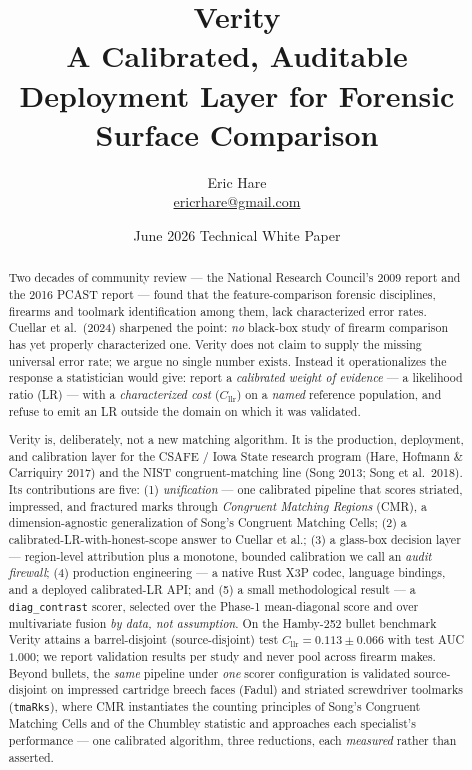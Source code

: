 \documentclass[11pt]{article}
\title{\vspace{-1.2cm}\textbf{Verity}\\[2pt]
\large A Calibrated, Auditable Deployment Layer for Forensic Surface Comparison}
\author{Eric Hare\\[-2pt]\small \href{mailto:ericrhare@gmail.com}{ericrhare@gmail.com}}
\date{\small June 2026 \;\textbar\; Technical White Paper}
\newcommand{\Cllr}{C_{\mathrm{llr}}}
\newcommand{\diagcontrast}{\texttt{diag\_contrast}}
\newcommand{\code}[1]{\texttt{#1}}
\begin{document}
\maketitle
\vspace{-0.6cm}

\begin{abstract}
\noindent
Two decades of community review --- the National Research Council's 2009 report
and the 2016 PCAST report --- found that the feature-comparison forensic
disciplines, firearms and toolmark identification among them, lack characterized
error rates. Cuellar et al.\ (2024) sharpened the point: \emph{no} black-box study
of firearm comparison has yet properly characterized one. Verity does not claim to
supply the missing universal error rate; we argue no single number exists. Instead
it operationalizes the response a statistician would give: report a \emph{calibrated
weight of evidence} --- a likelihood ratio (LR) --- with a \emph{characterized
cost} ($\Cllr$) on a \emph{named} reference population, and refuse to emit an LR
outside the domain on which it was validated.

Verity is, deliberately, not a new matching algorithm. It is the production,
deployment, and calibration layer for the CSAFE / Iowa State research program
(Hare, Hofmann \& Carriquiry 2017) and the NIST congruent-matching line
(Song 2013; Song et al.\ 2018). Its contributions are five: (1) \emph{unification}
--- one calibrated pipeline that scores striated, impressed, and fractured marks
through \emph{Congruent Matching Regions} (CMR), a dimension-agnostic
generalization of Song's Congruent Matching Cells; (2) a calibrated-LR-with-honest-scope
answer to Cuellar et al.; (3) a glass-box decision layer --- region-level
attribution plus a monotone, bounded calibration we call an \emph{audit firewall};
(4) production engineering --- a native Rust X3P codec, language bindings, and a
deployed calibrated-LR API; and (5) a small methodological result --- a
\diagcontrast{} scorer, selected over the Phase-1 mean-diagonal score and over
multivariate fusion \emph{by data, not assumption}. On the Hamby-252 bullet
benchmark Verity attains a barrel-disjoint (source-disjoint) test
$\Cllr = \num{0.113} \pm \num{0.066}$ with test AUC $\num{1.000}$; we report
validation results per study and never pool across firearm makes. Beyond bullets,
the \emph{same} pipeline under \emph{one} scorer configuration is validated
source-disjoint on impressed cartridge breech faces (Fadul) and striated
screwdriver toolmarks (\code{tmaRks}), where CMR instantiates the counting
principles of Song's Congruent Matching Cells and of the Chumbley statistic and
approaches each specialist's performance --- one calibrated algorithm, three
reductions, each \emph{measured} rather than asserted.
\end{abstract}
\end{document}
